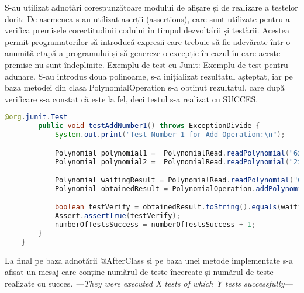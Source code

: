 \documentclass[a4paper,12pt]{article}
\begin{document}
\begin{enumerate}
S-au utilizat adnotări corespunzătoare modului de afișare și de realizare a testelor dorit:
\newline
De asemenea s-au utilizat aserții (assertions), care sunt utilizate pentru a verifica premisele corectitudinii codului în timpul dezvoltării și testării. Acestea permit programatorilor să introducă expresii care trebuie să fie adevărate într-o anumită etapă a programului și să genereze o excepție în cazul în care aceste premise nu sunt îndeplinite.
\newline
Exemplu de test cu Junit:
Exemplu de test pentru adunare. S-au introdus doua polinoame, s-a inițializat rezultatul așteptat, iar pe baza metodei din clasa PolynomialOperation s-a obtinut rezultatul, care după verificare s-a constat că este la fel, deci testul s-a realizat cu SUCCES.
\newline
\begin{lstlisting}[language = Java]
        @org.junit.Test
        public void testAddNumber1() throws ExceptionDivide {
            System.out.print("Test Number 1 for Add Operation:\n");

            Polynomial polynomial1 =  PolynomialRead.readPolynomial("6x^4+3x^2-5x-8");
            Polynomial polynomial2 =  PolynomialRead.readPolynomial("2x^-2+5x-6");

            Polynomial waitingResult = PolynomialRead.readPolynomial("6x^4+3x^2+2x^-2-14");
            Polynomial obtainedResult = PolynomialOperation.addPolynomial(polynomial1,polynomial2);

            boolean testVerify = obtainedResult.toString().equals(waitingResult.toString());
            Assert.assertTrue(testVerify);
            numberOfTestsSuccess = numberOfTestsSuccess + 1;
        }
    }
\end{lstlisting}
\newline
La final pe baza adnotării @AfterClass și pe baza unei metode implementate s-a afișat un mesaj care conține numărul de teste încercate și numărul de teste realizate cu succes.
\newline
\emph{---They were executed X tests of which Y
tests successfully---}
\vspace{1cm}

\end{enumerate}
\end{document}
